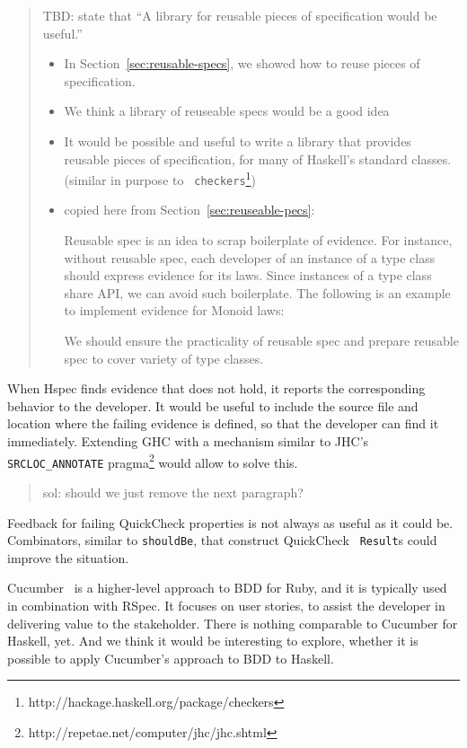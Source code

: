 \documentclass[preprint]{sigplanconf}
\begin{document}
\begin{quote}
    TBD: state that ``A library for reusable pieces of specification would be
    useful.''
\begin{itemize}
    \item
        In Section~\ref{sec:reusable-specs}, we showed how to reuse
        pieces of specification.
    \item
        We think a library of reuseable specs would be a good idea
    \item
        It would be possible and useful to write a library that
        provides reusable pieces of specification, for many of
        Haskell's standard classes.
        (similar in purpose to
        {\tt
        checkers}\footnote{http://hackage.haskell.org/package/checkers})
      \item copied here from Section~\ref{sec:reuseable-pecs}:

        Reusable spec is an idea to scrap boilerplate of evidence.
        For instance, without reusable spec,
        each developer of an instance of a type class should
        express evidence for its laws.
        Since instances of a type class share API,
        we can avoid such boilerplate.
        The following is an example to implement
        evidence for Monoid laws:

        We should ensure the practicality of reusable spec and
        prepare reusable spec to cover variety of type classes.

\end{itemize}
\end{quote}

When Hspec finds evidence that does not hold, it reports the
corresponding behavior to the developer.  It would be useful to
include the source file and location where the failing evidence is
defined, so that the developer can find it immediately.
Extending GHC with a mechanism similar to JHC's
\verb|SRCLOC_ANNOTATE| pragma\footnote{%
http://repetae.net/computer/jhc/jhc.shtml} would allow to solve this.


\begin{quote}
    sol: should we just remove the next paragraph?
\end{quote}

Feedback for failing QuickCheck properties is not always as useful as
it could be.
Combinators, similar to {\tt shouldBe}, that construct QuickCheck {\tt
Result}s could improve the situation.

Cucumber~\cite{cucumber} is a higher-level approach to BDD for Ruby, and
it is typically used in combination with RSpec.
It focuses on user stories, to assist the developer in delivering
value to the stakeholder.
There is nothing comparable to Cucumber for Haskell, yet.  And we think
it would be interesting to explore, whether it is possible to apply
Cucumber's approach to BDD to Haskell.
\end{document}
